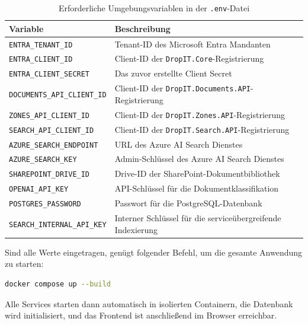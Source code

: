\begin{table}[h]
\centering
\caption{Erforderliche Umgebungsvariablen in der \texttt{.env}-Datei}
\label{tab:env-variablen}
\begin{tabularx}{\textwidth}{lX}
\toprule
\textbf{Variable} & \textbf{Beschreibung} \\
\midrule
\texttt{ENTRA\_TENANT\_ID}          & Tenant-ID des Microsoft Entra Mandanten \\
\texttt{ENTRA\_CLIENT\_ID}          & Client-ID der \texttt{DropIT.Core}-Registrierung \\
\texttt{ENTRA\_CLIENT\_SECRET}      & Das zuvor erstellte Client Secret \\
\texttt{DOCUMENTS\_API\_CLIENT\_ID} & Client-ID der \texttt{DropIT.Documents.API}-Registrierung \\
\texttt{ZONES\_API\_CLIENT\_ID}     & Client-ID der \texttt{DropIT.Zones.API}-Registrierung \\
\texttt{SEARCH\_API\_CLIENT\_ID}    & Client-ID der \texttt{DropIT.Search.API}-Registrierung \\
\texttt{AZURE\_SEARCH\_ENDPOINT}    & URL des Azure AI Search Dienstes \\
\texttt{AZURE\_SEARCH\_KEY}         & Admin-Schlüssel des Azure AI Search Dienstes \\
\texttt{SHAREPOINT\_DRIVE\_ID}      & Drive-ID der SharePoint-Dokumentbibliothek \\
\texttt{OPENAI\_API\_KEY}           & API-Schlüssel für die Dokumentklassifikation \\
\texttt{POSTGRES\_PASSWORD}         & Passwort für die PostgreSQL-Datenbank \\
\texttt{SEARCH\_INTERNAL\_API\_KEY} & Interner Schlüssel für die serviceübergreifende Indexierung \\
\bottomrule
\end{tabularx}
\end{table}
 
Sind alle Werte eingetragen, genügt folgender Befehl, um die gesamte
Anwendung zu starten:
 
\begin{lstlisting}[language=bash, caption={Start aller Services via Docker Compose}]
docker compose up --build
\end{lstlisting}
 
Alle Services starten dann automatisch in isolierten Containern, die
Datenbank wird initialisiert, und das Frontend ist anschließend im
Browser erreichbar.